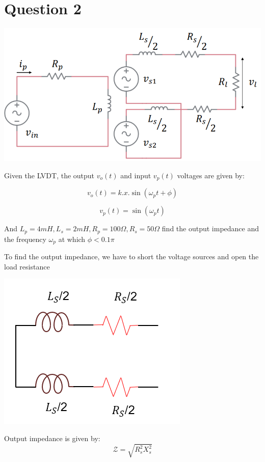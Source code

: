 \documentclass{article}
\begin{document}
\section*{Question 2}

\begin{center}
    \includegraphics*[scale=0.5]{lvdt.png}
\end{center}

Given the LVDT, the output $v_o(t)$ and input $v_p(t)$ voltages are given by:

\begin{equation*}
    v_o(t) = k . x . \sin(\omega_p t + \phi) 
\end{equation*}

\begin{equation*}
    v_p(t) = \sin(\omega_p t) 
\end{equation*}


And $L_p = 4mH, L_s = 2mH, R_p = 100 \Omega,  R_s = 50 \Omega$ find the output impedance and the frequency $\omega_p$ at which $\phi < 0.1\pi$\newline



To find the output impedance, we have to short the voltage sources and open the load resistance
\begin{center}
    \includegraphics*[scale=0.7]{ckt.png}
\end{center}

Output impedance is given by:
\begin{equation*}
    \mathcal{Z} = \sqrt{R_s^2 X_s^2}
\end{equation*}
\end{document}
